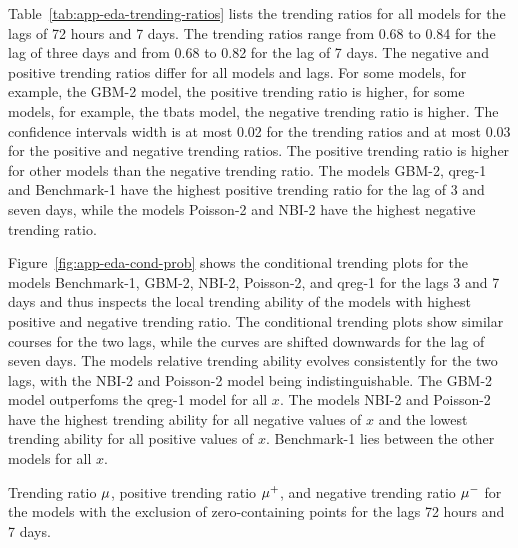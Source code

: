 Table~\ref{tab:app-eda-trending-ratios} lists the trending ratios for all models for the lags of 72 hours and 7 days.
The trending ratios range from 0.68 to 0.84 for the lag of three days and from 0.68 to 0.82 for the lag of 7 days.
The negative and positive trending ratios differ for all models and lags.
For some models, for example, the GBM-2 model, the positive trending ratio is higher, for some models, for example, the tbats model, the negative trending ratio is higher.
The confidence intervals width is at most 0.02 for the trending ratios and at most 0.03 for the positive and negative trending ratios.
The positive trending ratio is higher for other models than the negative trending ratio.
The models GBM-2, qreg-1 and Benchmark-1 have the highest positive trending ratio for the lag of 3 and seven days, while the models Poisson-2 and NBI-2 have the highest negative trending ratio.

Figure~\ref{fig:app-eda-cond-prob} shows the conditional trending plots for the models Benchmark-1, GBM-2, NBI-2, Poisson-2, and qreg-1 for the lags 3 and 7 days and thus inspects the local trending ability of the models with highest positive and negative trending ratio.
The conditional trending plots show similar courses for the two lags, while the curves are shifted downwards for the lag of seven days.
The models relative trending ability evolves consistently for the two lags, with the NBI-2 and Poisson-2 model being indistinguishable.
The GBM-2 model outperfoms the qreg-1 model for all $x$.
The models NBI-2 and Poisson-2 have the highest trending ability for all negative values of $x$ and the lowest trending ability for all positive values of $x$.
Benchmark-1 lies between the other models for all $x$.

\begin{table}
    \centering
    
    \caption{Trending ratio $\mu$, positive trending ratio $\mu^+$, and negative trending ratio $\mu^-$ for the models with the exclusion of zero-containing points for the lags 72 hours and 7 days.}
    \label{tab:app-eda-trending-ratios}
\end{table}

